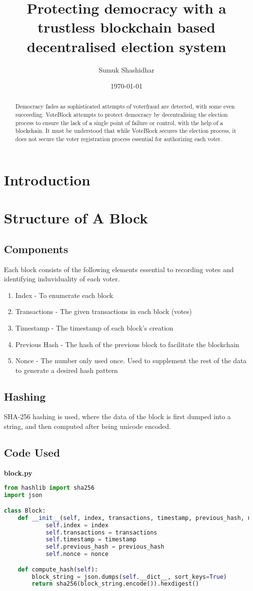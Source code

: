 \documentclass{article}
\title{Protecting democracy with a trustless blockchain based decentralised election system}
\author{Sumuk Shashidhar}
\date{\today}
\begin{document}
	\maketitle
	\begin{abstract}
		Democracy fades as sophisticated attempts of voterfraud are detected, with some even succeeding. VoteBlock attempts to protect democracy by decentralising the election process to ensure the lack of a single point of failure or control, with the help of a blockchain. It must be understood that while VoteBlock secures the election process, it does not secure the voter registration process essential for authorizing each voter. 
	\end{abstract}
	\pagebreak
	\tableofcontents
	\pagebreak
	\section{Introduction}
	\section{Structure of A Block}
	\subsection{Components}
	Each block consists of the following elements essential to recording votes and identifying induviduality of each voter.
	\begin{enumerate}
		\item Index - To enumerate each block
		\item Transactions - The given transactions in each block (votes)
		\item Timestamp - The timestamp of each block's creation
		\item Previous Hash - The hash of the previous block to facilitate the blockchain
		\item Nonce - The number only used once. Used to supplement the rest of the data to generate a desired hash pattern
	\end{enumerate}
	\subsection{Hashing}
	SHA-256 hashing is used, where the data of the block is first dumped into a string, and then computed after being unicode encoded.
	\subsection{Code Used}
	\textbf{block.py}
	\begin{lstlisting}[language=Python]
from hashlib import sha256
import json

class Block:
	def __init__(self, index, transactions, timestamp, previous_hash, nonce=0):
			self.index = index
			self.transactions = transactions
			self.timestamp = timestamp
			self.previous_hash = previous_hash
			self.nonce = nonce

	def compute_hash(self):
		block_string = json.dumps(self.__dict__, sort_keys=True)
		return sha256(block_string.encode()).hexdigest()
	\end{lstlisting}
\end{document}
